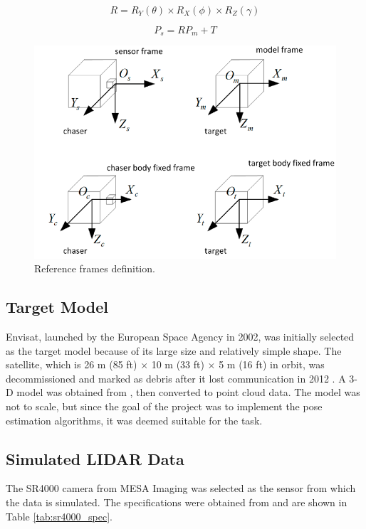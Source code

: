 \documentclass[conference]{IEEEtran}
\begin{document}
		\begin{equation}
			\label{eqn:R}
			R = R_Y(\theta) \times R_X(\phi) \times R_Z(\gamma)
		\end{equation}
	
		\begin{equation}
			\label{eqn:Ps}
			P_s = RP_m + T
		\end{equation}
	
	\begin{figure}[htbp]
		\centerline{\includegraphics{Images/ReferenceFrames.PNG}}
		\caption{Reference frames definition.}
		\label{ReferenceFrames}
	\end{figure}


	\subsection{Target Model}
		Envisat, launched by the European Space Agency in 2002, was initially selected as the target model because of its large size and relatively simple shape. The satellite, which is 26 m (85 ft) × 10 m (33 ft) × 5 m (16 ft) in orbit, was decommissioned and marked as debris after it lost communication in 2012 \cite{envisat_overview}. A 3-D model was obtained from \cite{envisat_3d_model}, then converted to point cloud data. The model was not to scale, but since the goal of the project was to implement the pose estimation algorithms, it was deemed suitable for the task. 


	\subsection{Simulated LIDAR Data} 
		The SR4000 camera from MESA Imaging was selected as the sensor from which the data is simulated. The specifications were obtained from \cite{camera_specs} and are shown in Table \ref{tab:sr4000_spec}.
\end{document}
